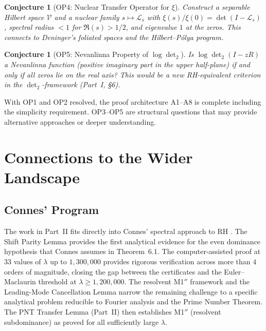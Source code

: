 \documentclass[12pt,a4paper]{article}
\newtheorem{conjecture}[theorem]{Conjecture}
\theoremstyle{definition}
\theoremstyle{remark}
\begin{document}
\begin{conjecture}[OP4: Nuclear Transfer Operator for $\xi$]
\label{conj:OP4}
Construct a separable Hilbert space $\mathcal{V}$ and a nuclear family $s \mapsto \mathcal{L}_s$ with $\xi(s)/\xi(0) = \det(I - \mathcal{L}_s)$, spectral radius $< 1$ for $\Re(s) > 1/2$, and eigenvalue $1$ at the zeros. This connects to Deninger's foliated spaces and the Hilbert--P\'olya program.
\end{conjecture}

\begin{conjecture}[OP5: Nevanlinna Property of $\log\det_2$]
\label{conj:OP5}
Is $\log\det_2(I - zR)$ a Nevanlinna function (positive imaginary part in the upper half-plane) if and only if all zeros lie on the real axis? This would be a new RH-equivalent criterion in the $\det_2$-framework (Part~I, \S6).
\end{conjecture}

\noindent With OP1 and OP2 resolved, the proof architecture A1--A8 is complete including the simplicity requirement. OP3--OP5 are structural questions that may provide alternative approaches or deeper understanding.


\section{Connections to the Wider Landscape}
\label{sec:connections}

\subsection{Connes' Program}

The work in Part~II fits directly into Connes' spectral approach to RH \cite{Connes2026}. The Shift Parity Lemma provides the first analytical evidence for the even dominance hypothesis that Connes assumes in Theorem~6.1. The computer-assisted proof at $33$ values of $\lambda$ up to $1{,}300{,}000$ provides rigorous verification across more than $4$ orders of magnitude, closing the gap between the certificates and the Euler--Maclaurin threshold at $\lambda \geq 1{,}200{,}000$. The resolvent M1$''$ framework and the Leading-Mode Cancellation Lemma narrow the remaining challenge to a specific analytical problem reducible to Fourier analysis and the Prime Number Theorem. The PNT Transfer Lemma (Part~II) then establishes M1$''$ (resolvent subdominance) as proved for all sufficiently large $\lambda$.
\end{document}
